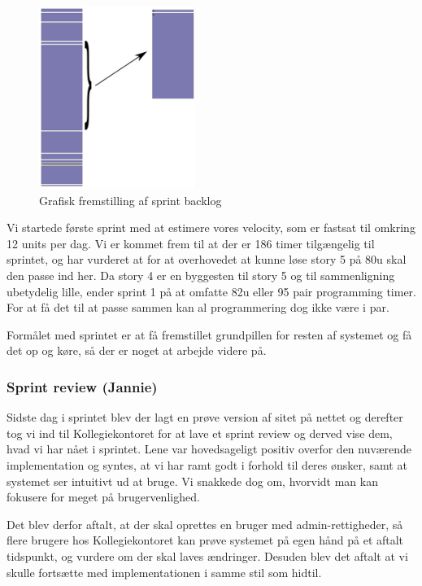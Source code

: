 \documentclass[12pt, a4paper]{report}
\begin{document}
\begin{figure}
\begin{center}
\includegraphics[width=0.45\textwidth]{sprint1log}
\end{center}
\caption{Grafisk fremstilling af sprint backlog}
\label{sprintlog1}
\end{figure}

Vi startede første sprint med at estimere vores velocity, som er fastsat til omkring 12 units per dag. Vi er kommet frem til at der er 186 timer tilgængelig til sprintet, og har vurderet at for at overhovedet at kunne løse story 5 på 80u skal den passe ind her. Da story 4 er en byggesten til story 5 og til sammenligning ubetydelig lille, ender sprint 1 på at omfatte 82u eller 95 pair programming timer. For at få det til at passe sammen kan al programmering dog ikke være i par.

Formålet med sprintet er at få fremstillet grundpillen for resten af systemet og få det op og køre, så der er noget at arbejde videre på.

\subsubsection{Sprint review (Jannie)}

Sidste dag i sprintet blev der lagt en prøve version af sitet på nettet og derefter tog vi ind til Kollegiekontoret for at lave et sprint review og derved vise dem, hvad vi har nået i sprintet. Lene var hovedsageligt positiv overfor den nuværende implementation og syntes, at vi har ramt godt i forhold til deres ønsker, samt at systemet ser intuitivt ud at bruge. Vi snakkede dog om, hvorvidt man kan fokusere for meget på brugervenlighed.

Det blev derfor aftalt, at der skal oprettes en bruger med admin-rettigheder, så flere brugere hos Kollegiekontoret kan prøve systemet på egen hånd på et aftalt tidspunkt, og vurdere om der skal laves ændringer. Desuden blev det aftalt at vi skulle fortsætte med implementationen i samme stil som hidtil.
\end{document}
